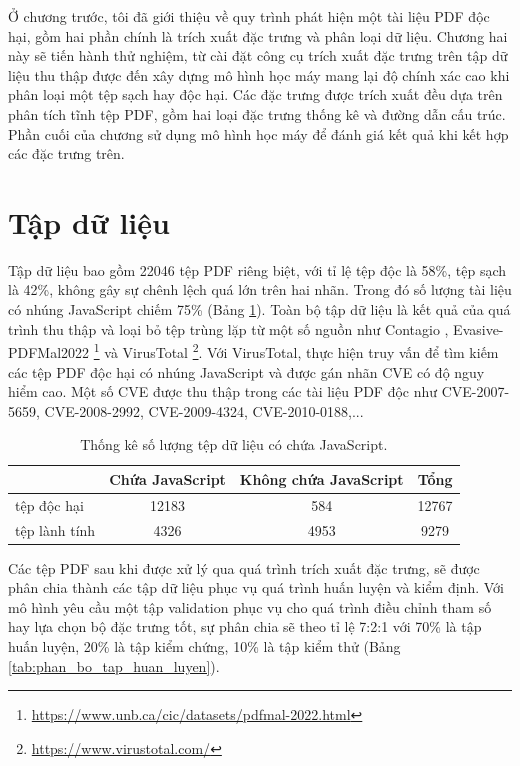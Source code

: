 \documentclass[./../main.tex]{subfiles}
\begin{document}
Ở chương trước, tôi đã giới thiệu về quy trình phát hiện một tài liệu PDF độc hại, gồm hai phần chính là trích xuất đặc trưng và phân loại dữ liệu. Chương hai này sẽ tiến hành thử nghiệm, từ cài đặt công cụ trích xuất đặc trưng trên tập dữ liệu thu thập được đến xây dựng mô hình học máy mang lại độ chính xác cao khi phân loại một tệp sạch hay độc hại. Các đặc trưng được trích xuất đều dựa trên phân tích tĩnh tệp PDF, gồm hai loại đặc trưng thống kê và đường dẫn cấu trúc. Phần cuối của chương sử dụng mô hình học máy để đánh giá kết quả khi kết hợp các đặc trưng trên.

\section{Tập dữ liệu}
Tập dữ liệu bao gồm 22046 tệp PDF riêng biệt, với tỉ lệ tệp độc là 58\%, tệp sạch là 42\%, không gây sự chênh lệch quá lớn trên hai nhãn. Trong đó số lượng tài liệu có nhúng JavaScript chiếm 75\% (Bảng \ref{tab:data_contain_JavaScript}). Toàn bộ tập dữ liệu là kết quả của quá trình thu thập và loại bỏ tệp trùng lặp từ một số nguồn như Contagio \cite{contagio}, Evasive-PDFMal2022 \footnote{\url{https://www.unb.ca/cic/datasets/pdfmal-2022.html}} và VirusTotal \footnote{\url{https://www.virustotal.com/}}. Với VirusTotal, thực hiện truy vấn để tìm kiếm các tệp PDF độc hại có nhúng JavaScript và được gán nhãn CVE có độ nguy hiểm cao. Một số CVE được thu thập trong các tài liệu PDF độc như CVE-2007-5659, CVE-2008-2992, CVE-2009-4324, CVE-2010-0188,...

\begin{table}[]
	\centering
	\caption{Thống kê số lượng tệp dữ liệu có chứa JavaScript.}
	\label{tab:data_contain_JavaScript}
	\begin{tabular}{|l|c|c|c|}
		\hline
		              & Chứa JavaScript & Không chứa JavaScript & Tổng  \\ \hline
		tệp độc hại   & 12183           & 584                   & 12767 \\ \hline
		tệp lành tính & 4326            & 4953                  & 9279  \\ \hline
	\end{tabular}
\end{table}

Các tệp PDF sau khi được xử lý qua quá trình trích xuất đặc trưng, sẽ được phân chia thành các tập dữ liệu phục vụ quá trình huấn luyện và kiểm định. Với mô hình yêu cầu một tập validation phục vụ cho quá trình điều chỉnh tham số hay lựa chọn bộ đặc trưng tốt, sự phân chia sẽ theo tỉ lệ 7:2:1 với 70\% là tập huấn luyện, 20\% là tập kiểm chứng, 10\% là tập kiểm thử (Bảng \ref{tab:phan_bo_tap_huan_luyen}).
\end{document}

